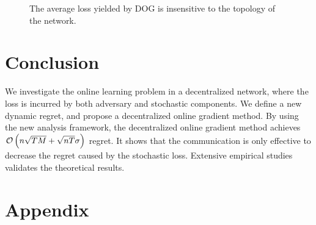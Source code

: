 \documentclass{article}
\begin{document}
\begin{figure}[!h]
\caption{The average loss yielded by DOG is insensitive to the topology of the network.}
\label{figure_compare_topology}
\end{figure}



\section{Conclusion}
We investigate the online learning problem in a decentralized network, where the loss is incurred by both adversary and stochastic components.  We define a new dynamic regret, and propose a decentralized online gradient method. By using the new analysis framework, the decentralized online gradient method  achieves ${\mathcal{O}\left( n\sqrt{TM} + \sqrt{nT}\sigma \right)}$ regret. It shows that the communication is only effective to decrease the regret caused by the stochastic loss. Extensive empirical studies validates the theoretical results. 






\onecolumn

\section*{Appendix}
\end{document}
